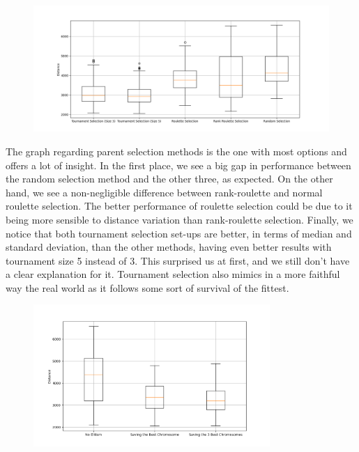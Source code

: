 \documentclass[11pt]{article}
\begin{document}
\begin{figure}
    \includegraphics[width=\textwidth]{../results/parent_selection_method_boxplot.png}
    \label{fig:parent_selection}
\end{figure}

The graph regarding parent selection methods is the one with most options and offers a lot of insight. In the first place, we see a big gap in performance between the random selection method and the other three, as expected. On the other hand, we see a non-negligible difference between rank-roulette and normal roulette selection. The better performance of roulette selection could be due to it being more sensible to distance variation than rank-roulette selection. Finally, we notice that both tournament selection set-ups are better, in terms of median and standard deviation, than the other methods, having even better results with tournament size 5 instead of 3. This surprised us at first, and we still don't have a clear explanation for it. Tournament selection also mimics in a more faithful way the real world as it follows some sort of survival of the fittest.

\begin{figure}
    \includegraphics[width=0.8\textwidth]{../results/elitism_boxplot.png}
    \label{fig:elitism}
\end{figure}
\end{document}
